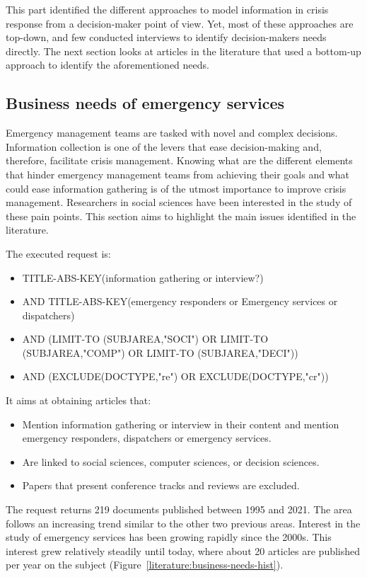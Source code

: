 This part identified the different approaches to model information in crisis response from a decision-maker point of view.
Yet, most of these approaches are top-down, and few conducted interviews to identify decision-makers needs directly.
The next section looks at articles in the literature that used a bottom-up approach to identify the aforementioned needs.

\subsection{Business needs of emergency services}
Emergency management teams are tasked with novel and complex decisions.
Information collection is one of the levers that ease decision-making and, therefore,
facilitate crisis management.
Knowing what are the different elements that hinder emergency management teams from
achieving their goals and what could ease information gathering is of the utmost importance to improve crisis management.
Researchers in social sciences have been interested in the study of these pain points.
This section aims to highlight the main issues identified in the literature.

The executed request is:

\begin{itemize}
    \item TITLE-ABS-KEY({information gathering} or interview?)
    \item AND TITLE-ABS-KEY({emergency responders} or {Emergency services} or {dispatchers})
    \item AND (LIMIT-TO (SUBJAREA,"SOCI") OR LIMIT-TO (SUBJAREA,"COMP") OR LIMIT-TO (SUBJAREA,"DECI"))
    \item AND (EXCLUDE(DOCTYPE,"re") OR EXCLUDE(DOCTYPE,"cr"))
\end{itemize}

It aims at obtaining articles that:

\begin{itemize}
    \item Mention information gathering or interview in their content and mention emergency responders, dispatchers or emergency services.
    \item Are linked to social sciences, computer sciences, or decision sciences.
    \item Papers that present conference tracks and reviews are excluded.
\end{itemize}

The request returns 219 documents published between 1995 and 2021.
The area follows an increasing trend similar to the other two previous areas.
Interest in the study of emergency services has been growing rapidly since the 2000s.
This interest grew relatively steadily until today, where about 20 articles are published per year on the subject (Figure~\ref{literature:business-needs-hist}).

